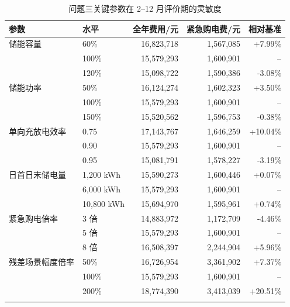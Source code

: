 \begin{table}[H]
  \centering
  \caption{问题三关键参数在 2--12 月评价期的灵敏度}
  \label{tab:q3-sens}
  \small
  \begin{tabular}{llrrr}
    \toprule
    参数 & 水平 & 全年费用/元 & 紧急购电费/元 & 相对基准 \\
    \midrule
    储能容量 & 60\% & 16,823,718 & 1,567,085 & +7.99\% \\
     & 100\% & 15,579,293 & 1,600,901 & -- \\
     & 120\% & 15,098,722 & 1,590,386 & -3.08\% \\
    \addlinespace
    储能功率 & 50\% & 16,124,274 & 1,602,323 & +3.50\% \\
     & 100\% & 15,579,293 & 1,600,901 & -- \\
     & 150\% & 15,520,562 & 1,596,753 & -0.38\% \\
    \addlinespace
    单向充放电效率 & 0.75 & 17,143,767 & 1,646,259 & +10.04\% \\
     & 0.90 & 15,579,293 & 1,600,901 & -- \\
     & 0.95 & 15,081,791 & 1,578,227 & -3.19\% \\
    \addlinespace
    日首日末储电量 & 1,200 kWh & 15,590,273 & 1,600,446 & +0.07\% \\
     & 6,000 kWh & 15,579,293 & 1,600,901 & -- \\
     & 10,800 kWh & 15,694,970 & 1,595,961 & +0.74\% \\
    \addlinespace
    紧急购电倍率 & 3 倍 & 14,883,972 & 1,172,709 & -4.46\% \\
     & 5 倍 & 15,579,293 & 1,600,901 & -- \\
     & 8 倍 & 16,508,397 & 2,244,904 & +5.96\% \\
    \addlinespace
    残差场景幅度倍率 & 50\% & 16,726,954 & 3,361,902 & +7.37\% \\
     & 100\% & 15,579,293 & 1,600,901 & -- \\
     & 200\% & 18,774,390 & 3,413,039 & +20.51\% \\
    \addlinespace
    \bottomrule
  \end{tabular}
\end{table}
